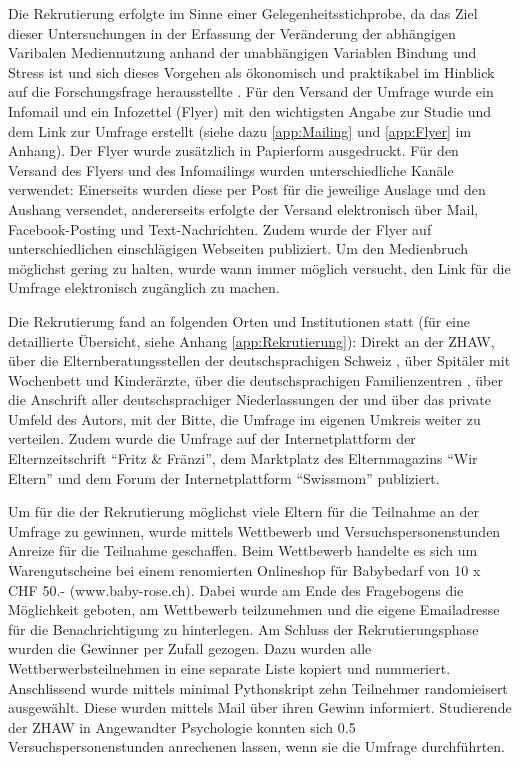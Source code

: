 Die Rekrutierung erfolgte im Sinne einer Gelegenheitsstichprobe, da das Ziel dieser Untersuchungen in der Erfassung der Veränderung der abhängigen Varibalen Mediennutzung anhand der unabhängigen Variablen Bindung und Stress ist und sich dieses Vorgehen als ökonomisch und praktikabel im Hinblick auf die Forschungsfrage herausstellte \cite{TUDresden2015}. Für den Versand der Umfrage wurde ein Infomail und ein Infozettel (Flyer) mit den wichtigsten Angabe zur Studie und dem Link zur Umfrage erstellt (siehe dazu \ref{app:Mailing} und \ref{app:Flyer} im Anhang). Der Flyer wurde zusätzlich in Papierform ausgedruckt. Für den Versand des Flyers und des Infomailings wurden unterschiedliche Kanäle verwendet: Einerseits wurden diese per Post für die jeweilige Auslage und den Aushang versendet, andererseits erfolgte der Versand elektronisch über Mail, Facebook-Posting und Text-Nachrichten. Zudem wurde der Flyer auf unterschiedlichen einschlägigen Webseiten publiziert. Um den Medienbruch möglichst gering zu halten, wurde wann immer möglich versucht, den Link für die Umfrage elektronisch zugänglich zu machen. 

Die Rekrutierung fand an folgenden Orten und Institutionen statt (für eine detaillierte Übersicht, siehe Anhang \ref{app:Rekrutierung}): Direkt an der ZHAW, über die Elternberatungsstellen der deutschsprachigen Schweiz \cite{Sfmvb2018}, über Spitäler mit Wochenbett und Kinderärzte, über die deutschsprachigen Familienzentren \cite{NetzwerkBildung2018}, über die Anschrift aller deutschsprachiger Niederlassungen der  und über das private Umfeld des Autors, mit der Bitte, die Umfrage im eigenen Umkreis weiter zu verteilen. Zudem wurde die Umfrage auf der Internetplattform der Elternzeitschrift \enquote{Fritz \&  Fränzi}, dem Marktplatz des Elternmagazins \enquote{Wir Eltern} und dem Forum der Internetplattform \enquote{Swissmom} publiziert.

Um für die der Rekrutierung möglichst viele Eltern für die Teilnahme an der Umfrage zu gewinnen, wurde mittels Wettbewerb und Versuchspersonenstunden Anreize für die Teilnahme geschaffen. Beim Wettbewerb handelte es sich um Warengutscheine bei einem renomierten Onlineshop für Babybedarf von 10 x CHF 50.- (www.baby-rose.ch). Dabei wurde am Ende des Fragebogens die Möglichkeit geboten, am Wettbewerb teilzunehmen und die eigene Emailadresse für die Benachrichtigung zu hinterlegen. Am Schluss der Rekrutierungsphase wurden die Gewinner per Zufall gezogen. Dazu wurden alle Wettberwerbsteilnehmen in eine separate Liste kopiert und nummeriert. Anschlissend wurde mittels minimal Pythonskript zehn Teilnehmer randomieisert ausgewählt. Diese wurden mittels Mail über ihren Gewinn informiert. Studierende der ZHAW in Angewandter Psychologie konnten sich 0.5 Versuchspersonenstunden anrechenen lassen, wenn sie die Umfrage durchführten. 

